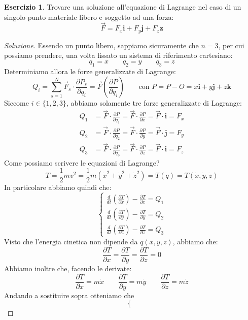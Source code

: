 \documentclass[11pt,a4paper,twoside]{article}
\theoremstyle{definition}
\newtheorem{ese}{Esercizio}[section]
\newenvironment{sol}
	{\renewcommand\qedsymbol{$\blacksquare$}\begin{proof}[Soluzione]}
	{\end{proof}}
\begin{document}
\begin{ese}
	Trovare una soluzione all'equazione di Lagrange nel caso di un singolo punto materiale libero e soggetto ad una forza:
	\[ \vec F = F_x \mathbf i + F_y \mathbf j + F_z \mathbf z \]
\end{ese}
\begin{sol}
	Essendo un punto libero, sappiamo sicuramente che $n=3$, per cui possiamo prendere, una volta fissato un sistema di riferimento cartesiano:
	\[ q_1=x \qquad q_2 = y\qquad q_3 = z \]
	Determiniamo allora le forze generalizzate di Lagrange:
	\[ Q_i = \sum_{s=1}^N \vec F_s  \cdot \frac{\partial P_s}{\partial q_i}= \vec F \left( \frac{\partial P}{\partial q_i} \right) \qquad \text{con }P = P-O = x \mathbf i+ y \mathbf j + z \mathbf k\]
	Siccome $i \in \{1,2,3\}$, abbiamo solamente tre forze generalizzate di Lagrange:
	\begin{align*}
		Q_1 &= \vec F \cdot \frac{\partial P}{\partial q_1} = \vec F \cdot \frac{\partial P}{\partial x} = \vec F \cdot \mathbf i = F_x\\
		Q_2 &= \vec F \cdot \frac{\partial P}{\partial q_2} = \vec F \cdot \frac{\partial P}{\partial y} = \vec F \cdot \mathbf j = F_y\\
		Q_3 &= \vec F \cdot \frac{\partial P}{\partial q_3} = \vec F \cdot \frac{\partial P}{\partial z} = \vec F \cdot \mathbf i = F_z
	\end{align*}
	Come possiamo scrivere le equazioni di Lagrange?
	\[ T = \frac 12 mv^2 = \frac 12 m(\dot x^2 + \dot y^2 + \dot z^2) = T(\dot q) = T(\dot x, \dot y, \dot z) \]
	In particolare abbiamo quindi che:
	\[
		\begin{cases}
			\frac d{dt} \left(\frac{\partial T}{\partial \dot x} \right) - \frac{\partial T}{\partial x} = Q_1\\
			\frac d{dt} \left(\frac{\partial T}{\partial \dot y} \right) - \frac{\partial T}{\partial y} = Q_2\\
			\frac d{dt} \left(\frac{\partial T}{\partial \dot z} \right) - \frac{\partial T}{\partial z} = Q_3
		\end{cases}
	\]
	Visto che l'energia cinetica non dipende da $q(x,y,z)$, abbiamo che:
	\[ \frac{\partial T}{\partial x} =\frac{\partial T}{\partial y}=\frac{\partial T}{\partial z}= 0  \]
	Abbiamo inoltre che, facendo le derivate:
	\[ \frac{\partial T}{\partial x} = m\dot x \qquad \frac{\partial T}{\partial y} = m\dot y \qquad \frac{\partial T}{\partial z} = m\dot z \]
	Andando a sostituire sopra otteniamo che
	\[
		\begin{cases}

\end{cases}\]
\end{sol}
\end{document}
